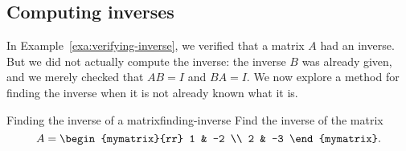 \subsection{Computing inverses}
\label{ssec:computing-inverses}

In Example~\ref{exa:verifying-inverse}, we verified that a matrix $A$
had an inverse. But we did not actually compute the inverse: the
inverse $B$ was already given, and we merely checked that $AB=I$ and
$BA=I$. We now explore a method for finding the inverse when it is not
already known what it is.

\begin{example}{Finding the inverse of a matrix}{finding-inverse}
  Find the inverse of the matrix
  \begin{equation*}
    A=\begin{mymatrix}{rr}
      1 & -2 \\
      2 & -3
    \end{mymatrix}.
  \end{equation*}
\end{example}

